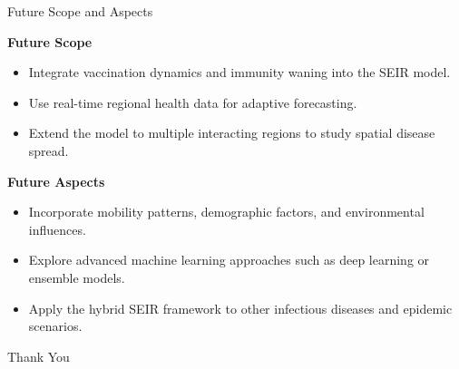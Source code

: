 \documentclass{beamer}
\begin{document}
\begin{frame}{Future Scope and Aspects}

\textbf{Future Scope}
\begin{itemize}
\item Integrate vaccination dynamics and immunity waning into the SEIR model.
\item Use real-time regional health data for adaptive forecasting.
\item Extend the model to multiple interacting regions to study spatial disease spread.
\end{itemize}

\vspace{0.3cm}

\textbf{Future Aspects}
\begin{itemize}
\item Incorporate mobility patterns, demographic factors, and environmental influences.
\item Explore advanced machine learning approaches such as deep learning or ensemble models.
\item Apply the hybrid SEIR framework to other infectious diseases and epidemic scenarios.
\end{itemize}

\end{frame}
\begin{frame}
\centering
\Huge Thank You
\end{frame}

\end{document}
